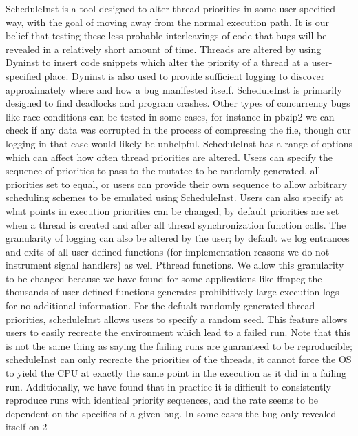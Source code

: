 \documentclass[10pt,]{article} %
\begin{document}
	ScheduleInst is a tool designed to alter thread priorities in some user specified way, with the goal of moving away from the normal execution path.  It is our belief that testing these less probable interleavings of code that bugs will be revealed in a relatively short amount of time.  Threads are altered by using Dyninst to insert code snippets which alter the priority of a thread at a user-specified place. Dyninst is also used to provide sufficient logging to discover approximately where and how a bug manifested itself. ScheduleInst is primarily designed to find deadlocks and program crashes.  Other types of concurrency bugs like race conditions can be tested in some cases, for instance in pbzip2 we can check if any data was corrupted in the process of compressing the file, though our logging in that case would likely be unhelpful.  
	ScheduleInst has a range of options which can affect how often thread priorities are altered.  Users can specify the sequence of priorities to pass to the mutatee to be randomly generated, all priorities set to equal, or users can provide their own sequence to allow arbitrary scheduling schemes to be emulated using ScheduleInst.  Users can also specify at what points in execution priorities can be changed; by default priorities are set when a thread is created and after all thread synchronization function calls.  The granularity of logging can also be altered by the user; by default we log entrances and exits of all user-defined functions (for implementation reasons we do not instrument signal handlers) as well Pthread functions.  We allow this granularity to be changed because we have found for some applications like ffmpeg the thousands of user-defined functions generates prohibitively large execution logs for no additional information.    
	For the defualt randomly-generated thread priorities, scheduleInst allows users to specify a random seed. This feature allows users to easily recreate the environment which lead to a failed run.  Note that this is not the same thing as saying the failing runs are guaranteed to be reproducible; scheduleInst can only recreate the priorities of the threads, it cannot force the OS to yield the CPU at exactly the same point in the execution as it did in a failing run.  Additionally, we have found that in practice it is difficult to consistently  reproduce runs with identical priority sequences, and the rate seems to be dependent on the specifics of a given bug. In some cases the bug only revealed itself on 2%
\end{document}
